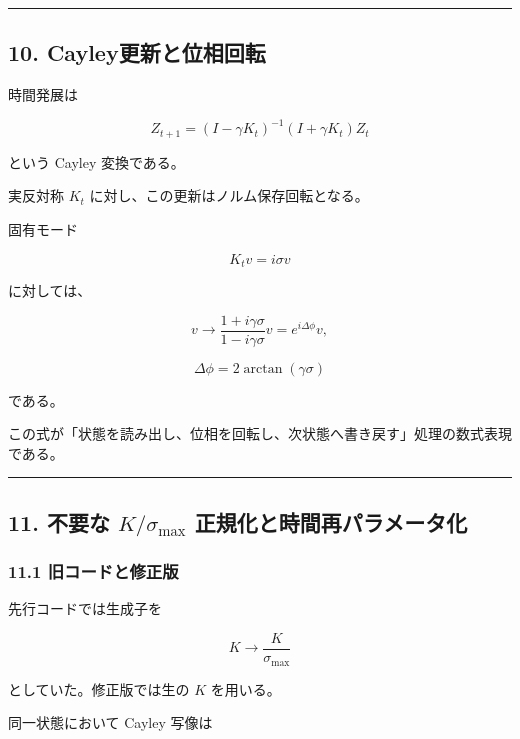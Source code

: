 \documentclass[
  a4paper,
]{ltjsarticle}
\begin{document}
\begin{center}\rule{0.5\linewidth}{0.5pt}\end{center}

\subsection{10.
Cayley更新と位相回転}\label{cayleyux66f4ux65b0ux3068ux4f4dux76f8ux56deux8ee2}

時間発展は

\[
Z_{t+1}
=
(I-\gamma K_t)^{-1}
(I+\gamma K_t)Z_t
\]

という Cayley 変換である。

実反対称 \(K_t\) に対し、この更新はノルム保存回転となる。

固有モード

\[
K_tv=i\sigma v
\]

に対しては、

\[
v\rightarrow
\frac{1+i\gamma\sigma}
     {1-i\gamma\sigma}v
=
e^{i\Delta\phi}v,
\]

\[
\boxed{
\Delta\phi
=
2\arctan(\gamma\sigma)
}
\]

である。

この式が「状態を読み出し、位相を回転し、次状態へ書き戻す」処理の数式表現である。

\begin{center}\rule{0.5\linewidth}{0.5pt}\end{center}

\subsection{\texorpdfstring{11. 不要な \(K/\sigma_{\max}\)
正規化と時間再パラメータ化}{11. 不要な K/\textbackslash sigma\_\{\textbackslash max\} 正規化と時間再パラメータ化}}\label{ux4e0dux8981ux306a-ksigma_max-ux6b63ux898fux5316ux3068ux6642ux9593ux518dux30d1ux30e9ux30e1ux30fcux30bfux5316}

\subsubsection{11.1
旧コードと修正版}\label{ux65e7ux30b3ux30fcux30c9ux3068ux4feeux6b63ux7248}

先行コードでは生成子を

\[
K\rightarrow\frac{K}{\sigma_{\max}}
\]

としていた。修正版では生の \(K\) を用いる。

同一状態において Cayley 写像は
\end{document}

